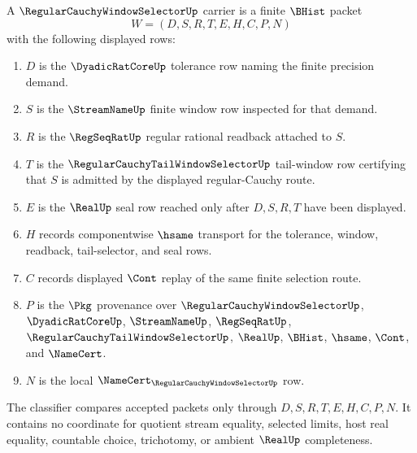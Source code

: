 \begin{definition}
\label{def:regular-cauchy-window-selector-carrier}
A $\RegularCauchyWindowSelectorUp$ carrier is a finite $\BHist$ packet
$$
W=(D,S,R,T,E,H,C,P,N)
$$
with the following displayed rows:
\begin{enumerate}
\item $D$ is the $\DyadicRatCoreUp$ tolerance row naming the finite precision demand.
\item $S$ is the $\StreamNameUp$ finite window row inspected for that demand.
\item $R$ is the $\RegSeqRatUp$ regular rational readback attached to $S$.
\item $T$ is the $\RegularCauchyTailWindowSelectorUp$ tail-window row certifying that $S$ is admitted by the displayed regular-Cauchy route.
\item $E$ is the $\RealUp$ seal row reached only after $D,S,R,T$ have been displayed.
\item $H$ records componentwise $\hsame$ transport for the tolerance, window, readback, tail-selector, and seal rows.
\item $C$ records displayed $\Cont$ replay of the same finite selection route.
\item $P$ is the $\Pkg$ provenance over $\RegularCauchyWindowSelectorUp$, $\DyadicRatCoreUp$, $\StreamNameUp$, $\RegSeqRatUp$, $\RegularCauchyTailWindowSelectorUp$, $\RealUp$, $\BHist$, $\hsame$, $\Cont$, and $\NameCert$.
\item $N$ is the local $\NameCert_{\RegularCauchyWindowSelectorUp}$ row.
\end{enumerate}
The classifier compares accepted packets only through $D,S,R,T,E,H,C,P,N$. It contains no coordinate for quotient stream equality, selected limits, host real equality, countable choice, trichotomy, or ambient $\RealUp$ completeness.
\end{definition}


